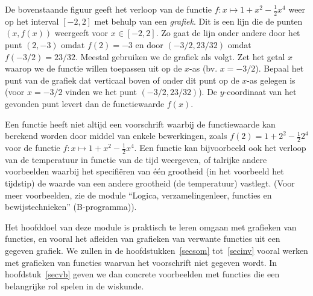 \begin{center}
\end{center}


De bovenstaande figuur geeft het verloop van de functie $f:x\mapsto
1+x^2-\frac{1}{2}x^4$ weer op het interval $[-2,2]$ met behulp van een
{\em grafiek}. Dit is een lijn die de punten $(x,f(x))$ weergeeft voor
$x\in[-2,2]$. Zo gaat de lijn onder andere door het punt $(2,-3)$
omdat $f(2)=-3$ en door $(-3/2,23/32)$ omdat $f(-3/2)=23/32$. Meestal
gebruiken we de grafiek als volgt. Zet het getal $x$ waarop we de
functie willen toepassen uit op de $x$-as (bv. $x=-3/2$). Bepaal het
punt van de grafiek dat verticaal boven of onder dit punt op de $x$-as
gelegen is (voor $x=-3/2$ vinden we het punt $(-3/2,23/32)$). De
$y$-coordinaat van het gevonden punt levert dan de functiewaarde
$f(x)$.

Een functie heeft niet altijd een voorschrift waarbij de functiewaarde
kan berekend worden door middel van enkele bewerkingen, zoals
$f(2)=1+2^2-\frac{1}{2}2^4$ voor de functie $f:x\mapsto
1+x^2-\frac{1}{2}x^4$. Een functie kan bijvoorbeeld ook het verloop
van de temperatuur in functie van de tijd weergeven, of talrijke
andere voorbeelden waarbij het specifi\"eren van \'e\'en grootheid (in
het voorbeeld het tijdstip) de waarde van een andere grootheid (de
temperatuur) vastlegt. (Voor meer voorbeelden, zie de module ``Logica,
verzamelingenleer, functies en bewijstechnieken'' (B-programma)).

Het hoofddoel van deze module is praktisch te leren omgaan met
grafieken van functies, en vooral het afleiden van grafieken van
verwante functies uit een gegeven grafiek. We zullen in
de hoofdstukken~\ref{secsom} tot~\ref{secinv} vooral werken met
grafieken van functies waarvan het voorschrift niet gegeven
wordt. In hoofdstuk~\ref{secvb} geven we dan concrete voorbeelden
met functies die een belangrijke rol spelen in de wiskunde.

